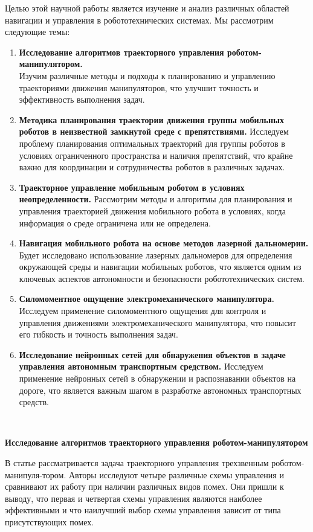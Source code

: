 \documentclass[russian,11pt]{article}
\providecommand{\header}[1]{
\,
\begin{center}
{\Large \textbf{#1}}
\end{center}
}
\begin{document}
Целью этой научной работы является изучение и анализ различных областей навигации и управления в робототехнических системах. Мы рассмотрим следующие темы:
\begin{enumerate}
\item \textbf{Исследование алгоритмов траекторного управления роботом-манипулятором.} \\Изучим различные методы и подходы к планированию и управлению траекториями движения манипуляторов, что улучшит точность и эффективность выполнения задач.
\item \textbf{Методика планирования траектории движения группы мобильных роботов в неизвестной замкнутой среде с препятствиями.} Исследуем проблему планирования оптимальных траекторий для группы роботов в условиях ограниченного пространства и наличия препятствий, что крайне важно для координации и сотрудничества роботов в различных задачах.
\item \textbf{Траекторное управление мобильным роботом в условиях неопределенности.} Рассмотрим методы и алгоритмы для планирования и управления траекторией движения мобильного робота в условиях, когда информация о среде ограничена или не определена.
\item \textbf{Навигация мобильного робота на основе методов лазерной дальномерии.} Будет исследовано использование лазерных дальномеров для определения окружающей среды и навигации мобильных роботов, что является одним из ключевых аспектов автономности и безопасности робототехнических систем.
\item \textbf{Силомоментное ощущение электромеханического манипулятора.} Исследуем применение силомоментного ощущения для контроля и управления движениями электромеханического манипулятора, что повысит его гибкость и точность выполнения задач.
\item \textbf{Исследование нейронных сетей для обнаружения объектов в задаче управления автономным транспортным средством.} Исследуем применение нейронных сетей в обнаружении и распознавании объектов на дороге, что является важным шагом в разработке автономных транспортных средств.
\end{enumerate}
\header{Исследование алгоритмов траекторного управления
роботом-манипулятором \cite{1}}

В статье рассматривается задача траекторного управления трехзвенным роботом-манипуля-тором. Авторы исследуют четыре различные схемы управления и сравнивают их работу при наличии различных видов помех. Они пришли к выводу, что первая и четвертая схемы управления являются наиболее эффективными и что наилучший выбор схемы управления зависит от типа присутствующих помех.
\end{document}
